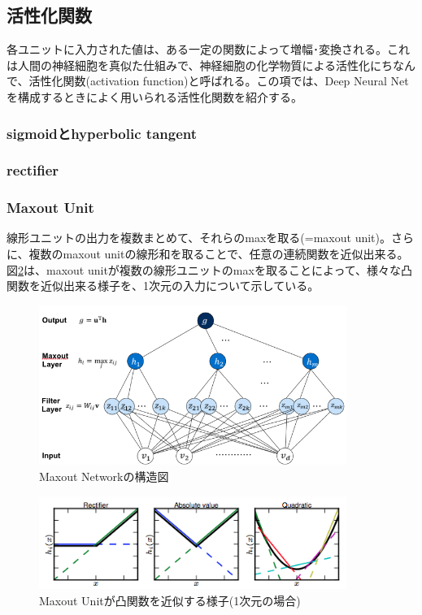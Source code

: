 \subsection{活性化関数}
各ユニットに入力された値は、ある一定の関数によって増幅･変換される。これは人間の神経細胞を真似た仕組みで、神経細胞の化学物質による活性化にちなんで、活性化関数(activation function)と呼ばれる。この項では、Deep Neural Netを構成するときによく用いられる活性化関数を紹介する。
\subsubsection{sigmoidとhyperbolic tangent}
\subsubsection{rectifier}
\subsubsection{Maxout Unit}
線形ユニットの出力を複数まとめて、それらのmaxを取る(=maxout unit)。さらに、複数のmaxout unitの線形和を取ることで、任意の連続関数を近似出来る。\\
図\ref{c3_maxout_app}は、maxout unitが複数の線形ユニットのmaxを取ることによって、様々な凸関数を近似出来る様子を、1次元の入力について示している。
\begin{figure}[tbp]
 \begin{center}
  \includegraphics[width=100mm]{img/c3/maxout_arch}
 \end{center}
 \caption{Maxout Networkの構造図}
 \label{c3_maxout_arch}
\end{figure}
\begin{figure}[tbp]
 \begin{center}
  \includegraphics[width=100mm]{img/c3/maxout_app}
 \end{center}
 \caption{Maxout Unitが凸関数を近似する様子(1次元の場合)}
 \label{c3_maxout_app}
\end{figure}

